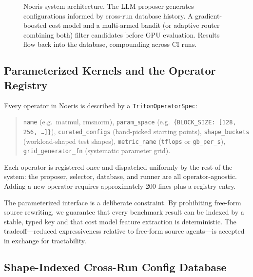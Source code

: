 \documentclass[11pt]{article}
\begin{document}
\begin{figure}[t]
\caption{Noeris system architecture. The LLM proposer generates configurations
informed by cross-run database history. A gradient-boosted cost model and a
multi-armed bandit (or adaptive router combining both) filter candidates before
GPU evaluation. Results flow back into the database, compounding across CI runs.}
\label{fig:system}
\end{figure}


\subsection{Parameterized Kernels and the Operator Registry}
\label{sec:operator-registry}

Every operator in Noeris is described by a \texttt{TritonOperatorSpec}:

\begin{quote}\small
\texttt{name} (e.g.\ matmul, rmsnorm),
\texttt{param\_space} (e.g.\ \texttt{\{BLOCK\_SIZE: [128, 256, \ldots]\}}),
\texttt{curated\_configs} (hand-picked starting points),
\texttt{shape\_buckets} (workload-shaped test shapes),
\texttt{metric\_name} (\texttt{tflops} or \texttt{gb\_per\_s}),
\texttt{grid\_generator\_fn} (systematic parameter grid).
\end{quote}

Each operator is registered once and dispatched uniformly by the rest of the
system: the proposer, selector, database, and runner are all operator-agnostic.
Adding a new operator requires approximately 200 lines plus a registry entry.

The parameterized interface is a deliberate constraint. By prohibiting free-form
source rewriting, we guarantee that every benchmark result can be indexed by a
stable, typed key and that cost model feature extraction is deterministic. The
tradeoff---reduced expressiveness relative to free-form source agents---is
accepted in exchange for tractability.


\subsection{Shape-Indexed Cross-Run Config Database}
\label{sec:config-db}
\end{document}
